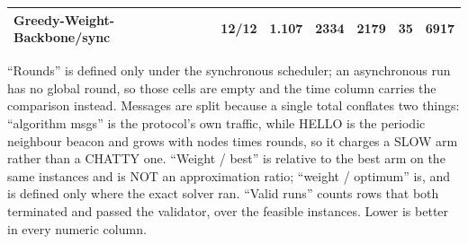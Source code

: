 \begin{table}[tb]
\begin{tabular}{lrrrrrr}
Greedy-Weight-Backbone/sync & 12/12 & 1.107 & 2334 & 2179 & 35 & 6917 \\
\bottomrule
\end{tabular}
\begin{flushleft}\footnotesize
``Rounds'' is defined only under the synchronous scheduler; an asynchronous run has no global round, so those cells are empty and the time column carries the comparison instead. Messages are split because a single total conflates two things: ``algorithm msgs'' is the protocol's own traffic, while HELLO is the periodic neighbour beacon and grows with nodes times rounds, so it charges a SLOW arm rather than a CHATTY one. ``Weight / best'' is relative to the best arm on the same instances and is NOT an approximation ratio; ``weight / optimum'' is, and is defined only where the exact solver ran. ``Valid runs'' counts rows that both terminated and passed the validator, over the feasible instances. Lower is better in every numeric column.
\end{flushleft}
\end{table}
